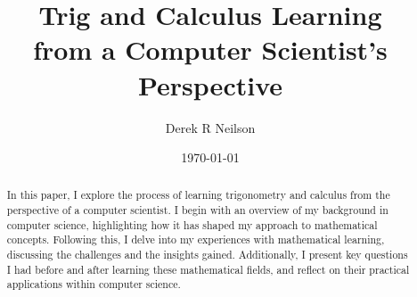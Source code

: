 \documentclass{article}
\title{Trig and Calculus Learning \\from a Computer Scientist's Perspective}
\author{Derek R Neilson}
\date{\today}
\begin{document}
\maketitle

\begin{abstract}
    In this paper, I explore the process of learning trigonometry and calculus from the perspective of a computer scientist. I begin with an overview of my background in computer science, highlighting how it has shaped my approach to mathematical concepts. Following this, I delve into my experiences with mathematical learning, discussing the challenges and the insights gained. Additionally, I present key questions I had before and after learning these mathematical fields, and reflect on their practical applications within computer science.
\end{abstract}

\end{document}
